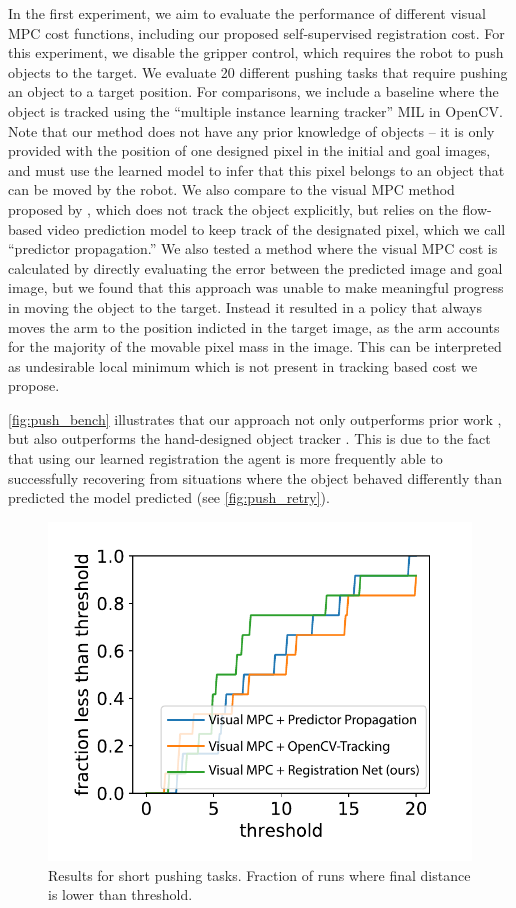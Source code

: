 In the first experiment, we aim to evaluate the performance of different visual MPC cost functions, including our proposed self-supervised registration cost. For this experiment, we disable the gripper control, which requires the robot to push objects to the target. We evaluate 20 different pushing tasks that require pushing an object to a target position. For comparisons, we include a baseline where the object is tracked using the ``multiple instance learning tracker'' MIL \cite{babenko2009visual} in OpenCV. Note that our method does not have any prior knowledge of objects -- it is only provided with the position of one designed pixel in the initial and goal images, and must use the learned model to infer that this pixel belongs to an object that can be moved by the robot. We also compare to the visual MPC method proposed by \cite{sna},
which does not track the object explicitly, but relies on the flow-based video prediction model to keep track of the designated pixel, which we call ``predictor propagation.'' We also tested a method where the visual MPC cost is calculated by directly evaluating the error between the predicted image and goal image, but we found that this approach was unable to make meaningful progress in moving the object to the target. Instead it resulted in a policy that always moves the arm to the position indicted in the target image, as the arm accounts for the majority of the movable pixel mass in the image. This can be interpreted as undesirable local minimum which is not present in tracking based cost we propose.

\autoref{fig:push_bench} illustrates that our approach not only outperforms prior work \cite{sna}, but also outperforms the hand-designed object tracker \cite{babenko2009visual}. This is due to the fact that using our learned registration the agent is more frequently able to successfully recovering from situations where the object behaved differently than predicted the model predicted (see \autoref{fig:push_retry}).

\begin{figure}
	\centering
	\includegraphics[width=0.6\columnwidth]{images_rfr/pushshort_bench_plots.pdf}
	\caption{\small{Results for short pushing tasks.  Fraction of runs where final distance is lower than threshold.}}
	\label{fig:push_bench_short}
\end{figure}

